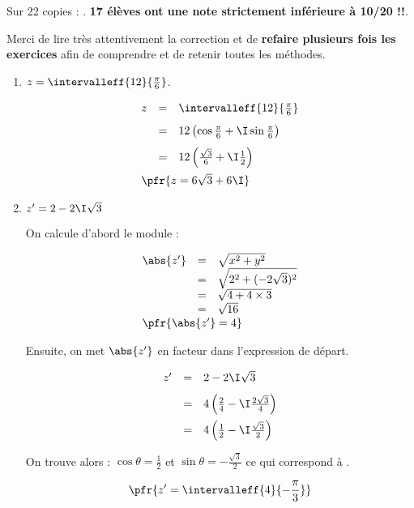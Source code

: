 \documentclass[10pt,french]{book}
\begin{document}
\pagestyle{empty}

\begin{center}
\end{center}\bigskip

\hrulefill\bigskip

Sur 22 copies : . \textbf{17 élèves ont une note strictement inférieure à 10/20 !!}.\par
Merci de lire très attentivement la correction et de \textbf{refaire plusieurs fois les exercices} afin de comprendre et de retenir toutes les méthodes.\bigskip

\hrulefill\bigskip

\exo
\begin{enumerate}
\item $z = \intervalleff{12}{\frac\pi 6}$.

\[\begin{array}{rcl}
    z & = & \intervalleff{12}{\frac\pi 6} \\[8pt]
      & = & 12\left(\cos \frac\pi 6 + \I \sin \frac \pi 6\right) \\[8pt]
      & = & 12\left(\frac{\sqrt 3}{6} + \I\frac 12\right)\\[8pt]
    \multicolumn{3}{l}{\pfr{z = 6\sqrt 3 + 6\I}}
\end{array}\]\bigskip

\item $z' = 2 - 2\I\sqrt 3$\bigskip

On calcule d'abord le module :

\[\begin{array}{rcl}
\abs{z' }& = & \sqrt{x^2 + y^2} \\
            & = & \sqrt{2^2 + (-2\sqrt 3)^2}\\
            & = & \sqrt{4 + 4\times 3} \\
            & = & \sqrt{16} \\
    \multicolumn{3}{l}{\pfr{\abs{z'} = 4}}
\end{array}\]

Ensuite, on met $\abs{z'}$ en facteur dans l'expression de départ.

\[\begin{array}{rcl}
z'& = & 2 - 2\I\sqrt 3 \\[8pt]
            & = & 4\left(\frac{2}{4} - \I\frac{2\sqrt3}{4}\right)\\[8pt]
            & = & 4\left(\frac{1}{2} - \I\frac{\sqrt3}{2}\right)
\end{array}\]

On trouve alors : $\cos \theta = \frac 1 2$ et $\sin \theta = -\frac{\sqrt 3}{2}$ ce qui correspond à .

\[\pfr{z' = \intervalleff{4}{-\frac{\pi}{3}}}\]
\end{enumerate}\clearpage
\end{document}
